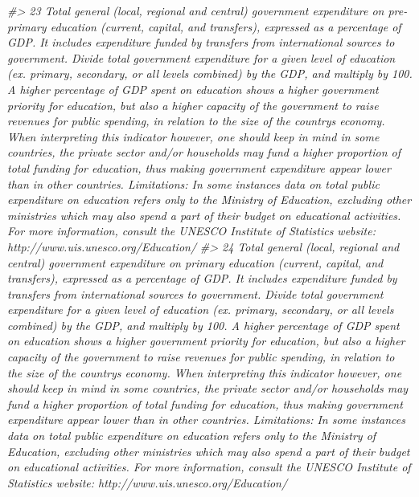 \documentclass[
  xelatex, ja=standard]{bxjsbook}
\newenvironment{Shaded}{\begin{snugshade}}{\end{snugshade}}
\newcommand{\CommentTok}[1]{\textcolor[rgb]{0.56,0.35,0.01}{\textit{#1}}}
\theoremstyle{definition}
\theoremstyle{definition}
\theoremstyle{definition}
\theoremstyle{definition}
\theoremstyle{remark}
\begin{document}
\begin{Shaded}
\begin{Highlighting}[]
\CommentTok{\#\textgreater{} 23                                                                                                                                                                                         Total general (local, regional and central) government expenditure on pre{-}primary education (current, capital, and transfers), expressed as a percentage of GDP. It includes expenditure funded by transfers from international sources to government. Divide total government expenditure for a given level of education (ex. primary, secondary, or all levels combined) by the GDP, and multiply by 100. A higher percentage of GDP spent on education shows a higher government priority for education, but also a higher capacity of the government to raise revenues for public spending, in relation to the size of the country\textquotesingle{}s economy. When interpreting this indicator however, one should keep in mind in some countries, the private sector and/or households may fund a higher proportion of total funding for education, thus making government expenditure appear lower than in other countries. Limitations: In some instances data on total public expenditure on education refers only to the Ministry of Education, excluding other ministries which may also spend a part of their budget on educational activities. For more information, consult the UNESCO Institute of Statistics website: http://www.uis.unesco.org/Education/}
\CommentTok{\#\textgreater{} 24                                                                                                                                                                                             Total general (local, regional and central) government expenditure on primary education (current, capital, and transfers), expressed as a percentage of GDP. It includes expenditure funded by transfers from international sources to government. Divide total government expenditure for a given level of education (ex. primary, secondary, or all levels combined) by the GDP, and multiply by 100. A higher percentage of GDP spent on education shows a higher government priority for education, but also a higher capacity of the government to raise revenues for public spending, in relation to the size of the country\textquotesingle{}s economy. When interpreting this indicator however, one should keep in mind in some countries, the private sector and/or households may fund a higher proportion of total funding for education, thus making government expenditure appear lower than in other countries. Limitations: In some instances data on total public expenditure on education refers only to the Ministry of Education, excluding other ministries which may also spend a part of their budget on educational activities. For more information, consult the UNESCO Institute of Statistics website: http://www.uis.unesco.org/Education/}

\end{Highlighting}
\end{Shaded}
\end{document}

